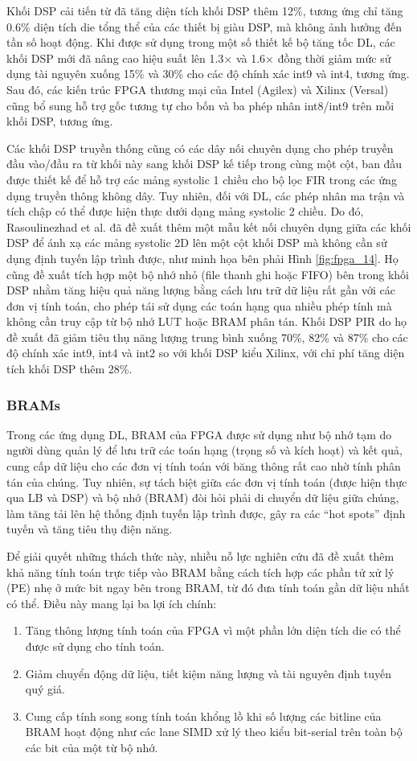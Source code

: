 \documentclass[a4paper]{article}
\begin{document}
Khối DSP cải tiến từ đã tăng diện tích khối DSP thêm 12\%, tương ứng chỉ tăng 0.6\% diện tích die tổng thể của các thiết bị giàu DSP, mà không ảnh hưởng đến tần số hoạt động. Khi được sử dụng trong một số thiết kế bộ tăng tốc DL, các khối DSP mới đã nâng cao hiệu suất lên 1.3× và 1.6× đồng thời giảm mức sử dụng tài nguyên xuống 15\% và 30\% cho các độ chính xác int9 và int4, tương ứng. Sau đó, các kiến trúc FPGA thương mại của Intel (Agilex) và Xilinx (Versal) cũng bổ sung hỗ trợ gốc tương tự cho bốn và ba phép nhân int8/int9 trên mỗi khối DSP, tương ứng.

Các khối DSP truyền thống cũng có các dây nối chuyên dụng cho phép truyền đầu vào/đầu ra từ khối này sang khối DSP kế tiếp trong cùng một cột, ban đầu được thiết kế để hỗ trợ các mảng systolic 1 chiều cho bộ lọc FIR trong các ứng dụng truyền thông không dây. Tuy nhiên, đối với DL, các phép nhân ma trận và tích chập có thể được hiện thực dưới dạng mảng systolic 2 chiều. Do đó, Rasoulinezhad et al. đã đề xuất thêm một mẫu kết nối chuyên dụng giữa các khối DSP để ánh xạ các mảng systolic 2D lên một cột khối DSP mà không cần sử dụng định tuyến lập trình được, như minh họa bên phải Hình \ref{fig:fpga_14}. Họ cũng đề xuất tích hợp một bộ nhớ nhỏ (file thanh ghi hoặc FIFO) bên trong khối DSP nhằm tăng hiệu quả năng lượng bằng cách lưu trữ dữ liệu rất gần với các đơn vị tính toán, cho phép tái sử dụng các toán hạng qua nhiều phép tính mà không cần truy cập từ bộ nhớ LUT hoặc BRAM phân tán. Khối DSP PIR do họ đề xuất đã giảm tiêu thụ năng lượng trung bình xuống 70\%, 82\% và 87\% cho các độ chính xác int9, int4 và int2 so với khối DSP kiểu Xilinx, với chi phí tăng diện tích khối DSP thêm 28\%.

\subsubsection{BRAMs}
Trong các ứng dụng DL, BRAM của FPGA được sử dụng như bộ nhớ tạm do người dùng quản lý để lưu trữ các toán hạng (trọng số và kích hoạt) và kết quả, cung cấp dữ liệu cho các đơn vị tính toán với băng thông rất cao nhờ tính phân tán của chúng. Tuy nhiên, sự tách biệt giữa các đơn vị tính toán (được hiện thực qua LB và DSP) và bộ nhớ (BRAM) đòi hỏi phải di chuyển dữ liệu giữa chúng, làm tăng tải lên hệ thống định tuyến lập trình được, gây ra các “hot spots” định tuyến và tăng tiêu thụ điện năng.

Để giải quyết những thách thức này, nhiều nỗ lực nghiên cứu đã đề xuất thêm khả năng tính toán trực tiếp vào BRAM bằng cách tích hợp các phần tử xử lý (PE) nhẹ ở mức bit ngay bên trong BRAM, từ đó đưa tính toán gần dữ liệu nhất có thể. Điều này mang lại ba lợi ích chính:
\begin{enumerate}
    \item Tăng thông lượng tính toán của FPGA vì một phần lớn diện tích die có thể được sử dụng cho tính toán.
    \item Giảm chuyển động dữ liệu, tiết kiệm năng lượng và tài nguyên định tuyến quý giá.
    \item Cung cấp tính song song tính toán khổng lồ khi số lượng các bitline của BRAM hoạt động như các lane SIMD xử lý theo kiểu bit-serial trên toàn bộ các bit của một từ bộ nhớ.
\end{enumerate}
\end{document}
